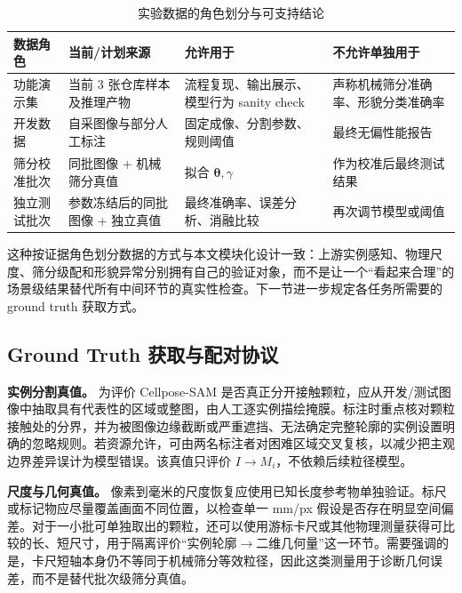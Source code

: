 \begin{table}[htbp]
\centering
\caption{实验数据的角色划分与可支持结论}
\label{tab:data-roles}
\small
\renewcommand{\arraystretch}{1.15}
\begin{tabular}{>{\raggedright\arraybackslash}p{2.6cm}>{\raggedright\arraybackslash}p{3.6cm}>{\raggedright\arraybackslash}p{4.0cm}>{\raggedright\arraybackslash}p{4.0cm}}
\toprule
数据角色 & 当前/计划来源 & 允许用于 & 不允许单独用于 \\
\midrule
功能演示集 & 当前 3 张仓库样本及推理产物 & 流程复现、输出展示、模型行为 sanity check & 声称机械筛分准确率、形貌分类准确率 \\
开发数据 & 自采图像与部分人工标注 & 固定成像、分割参数、规则阈值 & 最终无偏性能报告 \\
筛分校准批次 & 同批图像 + 机械筛分真值 & 拟合 $\boldsymbol{\theta},\gamma$ & 作为校准后最终测试结果 \\
独立测试批次 & 参数冻结后的同批图像 + 独立真值 & 最终准确率、误差分析、消融比较 & 再次调节模型或阈值 \\
\bottomrule
\end{tabular}
\end{table}

这种按证据角色划分数据的方式与本文模块化设计一致：上游实例感知、物理尺度、筛分级配和形貌异常分别拥有自己的验证对象，而不是让一个“看起来合理”的场景级结果替代所有中间环节的真实性检查。下一节进一步规定各任务所需要的 ground truth 获取方式。

\subsection{Ground Truth 获取与配对协议}
\label{sec:ground-truth}

\textbf{实例分割真值。} 为评价 Cellpose-SAM 是否真正分开接触颗粒，应从开发/测试图像中抽取具有代表性的区域或整图，由人工逐实例描绘掩膜。标注时重点核对颗粒接触处的分界，并为被图像边缘截断或严重遮挡、无法确定完整轮廓的实例设置明确的忽略规则。若资源允许，可由两名标注者对困难区域交叉复核，以减少把主观边界差异误计为模型错误。该真值只评价 $I\rightarrow M_i$，不依赖后续粒径模型。

\textbf{尺度与几何真值。} 像素到毫米的尺度恢复应使用已知长度参考物单独验证。标尺或标记物应尽量覆盖画面不同位置，以检查单一 mm/px 假设是否存在明显空间偏差。对于一小批可单独取出的颗粒，还可以使用游标卡尺或其他物理测量获得可比较的长、短尺寸，用于隔离评价“实例轮廓$\rightarrow$二维几何量”这一环节。需要强调的是，卡尺短轴本身仍不等同于机械筛分等效粒径，因此这类测量用于诊断几何误差，而不是替代批次级筛分真值。

